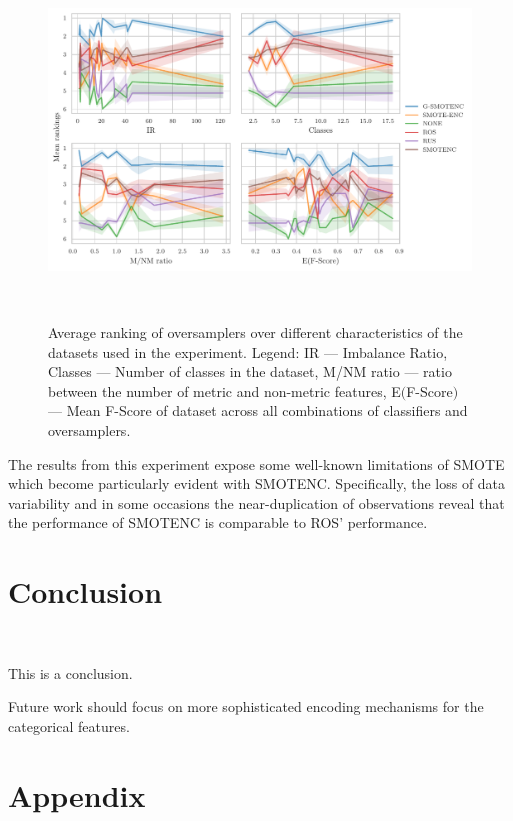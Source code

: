 \documentclass[parskip=full]{scrartcl}
\begin{document}
\begin{figure}
	\centering
	\includegraphics[width=\linewidth]{../analysis/consistency_analysis_plot}
    \caption{Average ranking of oversamplers over different characteristics of
        the datasets used in the experiment. Legend: IR --- Imbalance Ratio,
        Classes --- Number of classes in the dataset, M/NM ratio --- ratio
        between the number of metric and non-metric features, E$($F-Score$)$
        --- Mean F-Score of dataset across all combinations of classifiers and
        oversamplers.
    }~\label{fig:consistency_analysis}
\end{figure}


The results from this experiment expose some well-known limitations of SMOTE
which become particularly evident with SMOTENC. Specifically, the loss of data
variability and in some occasions the near-duplication of observations reveal
that the performance of SMOTENC is comparable to ROS' performance.

\section{Conclusion}~\label{sec:conclusion}

This is a conclusion.

Future work should focus on more sophisticated encoding mechanisms for the
categorical features.




\appendix

\section{Appendix}


\end{document}
